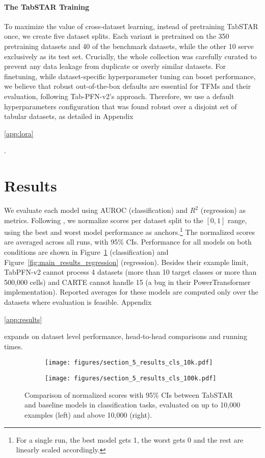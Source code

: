 \documentclass{article}
\newif\ifappendicesincluded
\newcommand{\appref}[1]{%
  \ifappendicesincluded
    \ref{#1}%
  \else
    \ref*{#1}%
  \fi
}
\begin{document}
\paragraph{The TabSTAR Training} To maximize the value of cross-dataset learning, instead of pretraining TabSTAR once, we create five dataset splits. Each variant is pretrained on the 350 pretraining datasets and 40 of the benchmark datasets, while the other 10 serve exclusively as its test set. 
Crucially, the whole collection was carefully curated to prevent any data leakage from duplicate or overly similar datasets. For finetuning, while dataset-specific hyperparameter tuning can boost performance, we believe that robust out-of-the-box defaults are essential for TFMs and their evaluation, following Tab-PFN-v2's approach. Therefore, we use a default hyperparameters configuration that was found robust over a disjoint set of tabular datasets, as detailed in Appendix~\appref{app:lora}. 

\section{Results}\label{sec:results}

We evaluate each model using AUROC (classification) and \(R^2\) (regression) as metrics. Following \cite{hollmann_accurate_2025}, we normalize scores per dataset split to the $[0, 1]$ range, using the best and worst model performance as anchors.\footnote{For a single run, the best model gets 1, the worst gets 0 and the rest are linearly scaled accordingly.} The normalized scores are averaged across all runs, with 95\% CIs. Performance for all models on both conditions are shown in Figure~\ref{fig:main_results_classification} (classification) and Figure~\ref{fig:main_results_regression} (regression). Besides their example limit, TabPFN-v2 cannot process 4 datasets (more than 10 target classes or more than 500,000 cells) and CARTE cannot handle 15 (a bug in their PowerTransformer implementation). Reported averages for these models are computed only over the datasets where evaluation is feasible. Appendix~\appref{app:results} expands on dataset level performance, head-to-head comparisons and running times.

\begin{figure}[h]
  \centering
  \begin{subfigure}{0.48\textwidth}
    \centering
    \texttt{[image: figures/section\_5\_results\_cls\_10k.pdf]}
  \end{subfigure}
  \hfill
  \begin{subfigure}{0.48\textwidth}
    \centering
    \texttt{[image: figures/section\_5\_results\_cls\_100k.pdf]}
  \end{subfigure}
  \caption{Comparison of normalized scores with 95\% CIs between TabSTAR and baseline models in classification tasks, evaluated on up to 10,000 examples (left) and above 10,000 (right).}
  \label{fig:main_results_classification}
\end{figure}
\end{document}

